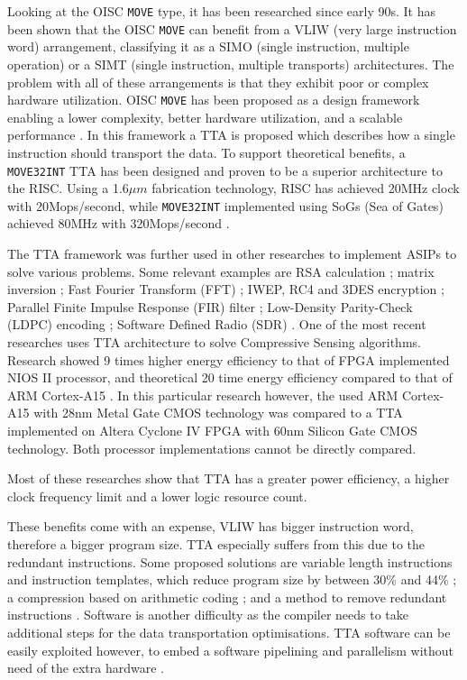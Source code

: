 Looking at the OISC \texttt{MOVE} type, it has been researched since early 90s. It has been shown that the OISC \texttt{MOVE} can benefit from a VLIW (very large instruction word) arrangement, classifying it as a SIMO (single instruction, multiple operation) or a SIMT (single instruction, multiple transports) architectures. The problem with all of these arrangements is that they exhibit poor or complex hardware utilization. OISC \texttt{MOVE} has been proposed as a design framework enabling a lower complexity, better hardware utilization, and a scalable performance \autocite{5348869}. In this framework a TTA is proposed which describes how a single instruction should transport the data. To support theoretical benefits, a \texttt{MOVE32INT} TTA has been designed \autocite{Corporaal94move32int} and proven to be a superior architecture to the RISC. Using a 1.6$\mu m$ fabrication technology, RISC has achieved 20MHz clock with 20Mops/second, while \texttt{MOVE32INT} implemented using SoGs (Sea of Gates) achieved 80MHz with 320Mops/second \autocite{289981}.

The TTA framework was further used in other researches to implement ASIPs to solve various problems. Some relevant examples are RSA calculation \autocite{6128530}; matrix inversion \autocite{1540373}; Fast Fourier Transform (FFT) \autocite{8682289}; IWEP, RC4 and 3DES encryption \autocite{922340}; Parallel Finite Impulse Response (FIR) filter \autocite{1511285}; Low-Density Parity-Check (LDPC) encoding \autocite{6855236}; Software Defined Radio (SDR) \autocite{7363689}. One of the most recent researches uses TTA architecture to solve Compressive Sensing algorithms. Research showed 9 times higher energy efficiency to that of FPGA implemented NIOS II processor, and theoretical 20 time energy efficiency compared to that of ARM Cortex-A15 \autocite{8573494}. In this particular research however, the used ARM Cortex-A15 with 28nm Metal Gate CMOS technology was compared to a TTA implemented on Altera Cyclone IV FPGA with 60nm Silicon Gate CMOS technology. Both processor implementations cannot be directly compared.

Most of these researches show that TTA has a greater power efficiency, a higher clock frequency limit and a lower logic resource count. 

These benefits come with an expense, VLIW has bigger instruction word, therefore a bigger program size. TTA especially suffers from this due to the redundant instructions. Some proposed solutions are variable length instructions and instruction templates, which reduce program size by between 30\% and 44\% \autocite{1213033,6893206}; a compression based on arithmetic coding \autocite{4627144}; and a method to remove redundant instructions \autocite{5403730}. 
Software is another difficulty as the compiler needs to take additional steps for the data transportation optimisations. TTA software can be easily exploited however, to embed a software pipelining and parallelism without need of the extra hardware \autocite{4595596}.

